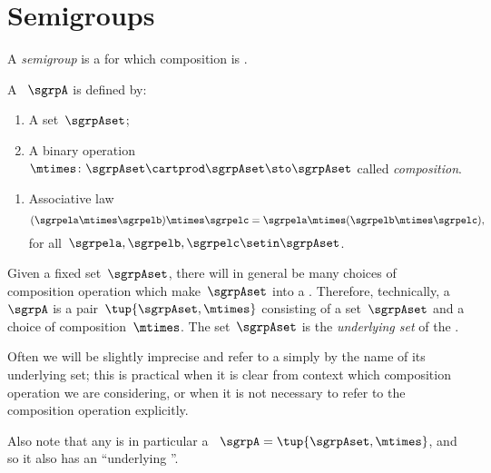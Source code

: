 
\section{Semigroups}
\label{sec:semigroups}
A \emph{semigroup} is a  for which composition is .

\begin{ctdefinition}[Semigroup]
    \label{def:semigroup}
    A ~$\sgrpA$ is defined by:
    \begin{body}
        \constit
        \begin{enumerate}
            \item A set~$\sgrpAset$;
            \item A binary operation~$\mtimes \colon \sgrpAset \cartprod \sgrpAset \sto \sgrpAset$ called \emph{composition}.
        \end{enumerate}
        \condit
        \begin{enumerate}
            \item Associative law
                  \begin{equation}
                      \label{eq:semigroup-associative}
                      (\sgrpela \mtimes   \sgrpelb)\mtimes   \sgrpelc
                      = \sgrpela \mtimes   (\sgrpelb \mtimes  \sgrpelc),
                  \end{equation}
                  for all~$\sgrpela, \sgrpelb, \sgrpelc \setin \sgrpAset$.
        \end{enumerate}
    \end{body}
\end{ctdefinition}

\begin{remark}
    Given a fixed set~$\sgrpAset$, there will in general be many choices of composition operation which make~$\sgrpAset$ into a .
    Therefore, technically, a  $\sgrpA$ is a pair~$\tup{\sgrpAset, \mtimes}$ consisting of a set~$\sgrpAset$ and a choice of composition~$\mtimes$.
    The set~$\sgrpAset$ is the \emph{underlying set} of the .

    Often we will be slightly imprecise and refer to a  simply by the name of its underlying set;
    this is practical when it is clear from context which composition operation we are considering, or when it is not necessary to refer to the composition operation explicitly.

    Also note that any  is in particular a ~$\sgrpA = \tup{\sgrpAset,\mtimes}$, and so it also has an ``underlying ''.
\end{remark}

